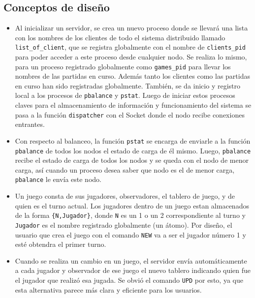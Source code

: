 \documentclass[a4paper]{article}
\newcommand{\blacktr}[0]{\item[$\blacktriangleright$]}
\begin{document}
\subsection*{Conceptos de diseño}
\begin{itemize}
  \blacktr Al inicializar un servidor, se crea un nuevo proceso donde se llevará una lista con los nombres de los clientes de todo el sistema distribuido llamado \texttt{list_of_client}, que se registra globalmente con el nombre de \texttt{clients_pid} para poder acceder a este proceso desde cualquier nodo. Se realiza lo mismo, para un proceso registrado globalmente como \texttt{games_pid} para llevar los nombres de las partidas en curso. Además tanto los clientes como las partidas en curso han sido registradas globalmente. También, se da inicio y registro local a los procesos de \texttt{pbalance} y \texttt{pstat}. Luego de iniciar estos procesos claves para el almacenamiento de información y funcionamiento del sistema se pasa a la función \texttt{dispatcher} con el Socket donde el nodo recibe conexiones entrantes.
  \blacktr Con respecto al balanceo, la función \texttt{pstat} se encarga de enviarle a la función \texttt{pbalance} de todos los nodos el estado de carga de él mismo. Luego, \texttt{pbalance} recibe el estado de carga de todos los nodos y se queda con el nodo de menor carga, así cuando un proceso desea saber que nodo es el de menor carga, \texttt{pbalance} le envía este nodo.
  \blacktr Un juego consta de sus jugadores, observadores, el tablero de juego, y de quien es el turno actual. Los jugadores dentro de un juego estan almacenados de la forma \texttt{\{N,Jugador\}}, donde \texttt{N} es un 1 o un 2 correspondiente al turno y \texttt{Jugador} es el nombre registrado globalmente (un átomo). Por diseño, el usuario que crea el juego con el comando \texttt{NEW} va a ser el jugador número 1 y esté obtendra el primer turno.
  \blacktr Cuando se realiza un cambio en un juego, el servidor envía automáticamente a cada jugador y observador de ese juego el nuevo tablero indicando quien fue el jugador que realizó esa jugada. Se obvió el comando \texttt{UPD} por esto, ya que esta alternativa parece más clara y eficiente para los usuarios. 
\end{itemize}
\end{document}
